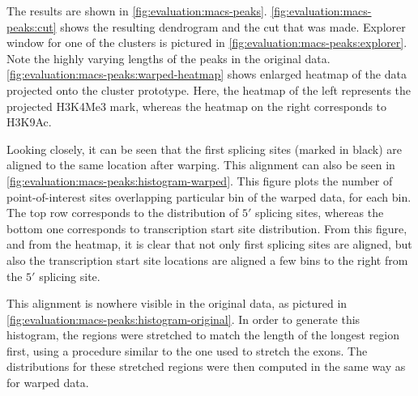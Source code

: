 \documentclass[parskip]{cs4rep}
\newcommand{\histonemodification}[1]{#1}
\begin{document}
The results are shown in \autoref{fig:evaluation:macs-peaks}. \autoref{fig:evaluation:macs-peaks:cut} shows the resulting dendrogram and the cut that was made. Explorer window for one of the clusters is pictured in \autoref{fig:evaluation:macs-peaks:explorer}. Note the highly varying lengths of the peaks in the original data. \autoref{fig:evaluation:macs-peaks:warped-heatmap} shows enlarged heatmap of the data projected onto the cluster prototype. Here, the heatmap of the left represents the projected \histonemodification{H3K4Me3} mark, whereas the heatmap on the right corresponds to \histonemodification{H3K9Ac}. 

Looking closely, it can be seen that the first splicing sites (marked in black) are aligned to the same location after warping. This alignment can also be seen in \autoref{fig:evaluation:macs-peaks:histogram-warped}. This figure plots the number of point-of-interest sites overlapping particular bin of the warped data, for each bin. The top row corresponds to the distribution of $5'$ splicing sites, whereas the bottom one corresponds to transcription start site distribution. From this figure, and from the heatmap, it is clear that not only first splicing sites are aligned, but also the transcription start site locations are aligned a few bins to the right from the $5'$ splicing site.

This alignment is nowhere visible in the original data, as pictured in \autoref{fig:evaluation:macs-peaks:histogram-original}. In order to generate this histogram, the regions were stretched to match the length of the longest region first, using a procedure similar to the one used to stretch the exons. The distributions for these stretched regions were then computed in the same way as for warped data.
\end{document}
